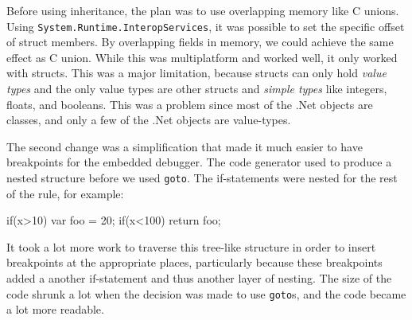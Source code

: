 Before using inheritance, the plan was to use overlapping memory like C unions. 
Using \verb|System.|\verb|Runtime.|\verb|InteropServices|, it was possible to set the specific offset of struct members.
By overlapping fields in memory, we could achieve the same effect as C union.
While this was multiplatform and worked well, it only worked with structs.
This was a major limitation, because structs can only hold \textit{value types} and the only value types are other structs and \textit{simple types} like integers, floats, and booleans.
This was a problem since most of the .Net objects are classes, and only a few of the .Net objects are value-types.

The second change was a simplification that made it much easier to have breakpoints for the embedded debugger.
The code generator used to produce a nested structure before we used \verb|goto|.
The if-statements were nested for the rest of the rule, for example:

\begin{CS}
    if(x>10){
        var foo = 20;    
        if(x<100){
            return foo;
        }
    }
\end{CS}

It took a lot more work to traverse this tree-like structure in order to insert breakpoints at the appropriate places, particularly because these breakpoints added a another if-statement and thus another layer of nesting.
The size of the code shrunk a lot when the decision was made to use \verb|goto|s, and the code became a lot more readable.

